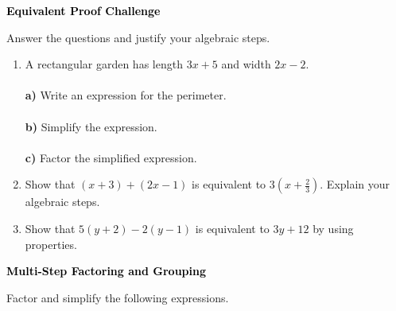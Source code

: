 \documentclass[12pt, letterpaper, fleqn]{article}
\newcommand{\blanklong}{\underline{\hspace{6.5cm}}}
\begin{document}
\newpage

\begin{tcolorbox}[colback=black!10]
\large\textcolor{black}{\textbf{Equivalent Proof Challenge}}
\end{tcolorbox}

\noindent
Answer the questions and justify your algebraic steps.

\vspace{3mm}

\begin{enumerate}[itemsep=2.2cm, leftmargin=0.6cm]

\item A rectangular garden has length $3x + 5$ and width $2x - 2$. \\ \\
\textbf{a)} Write an expression for the perimeter. \blanklong \\ \\
\textbf{b)} Simplify the expression. \blanklong \\ \\
\textbf{c)} Factor the simplified expression. \blanklong

\vspace{2cm}

\item Show that $(x+3) + (2x-1)$ is equivalent to $3(x + \frac{2}{3})$. Explain your algebraic steps.

\vspace{2cm}

\item Show that $5(y + 2) - 2(y - 1)$ is equivalent to $3y + 12$ by using properties.

\vspace{2cm}

\end{enumerate}

\newpage

\begin{tcolorbox}[colback=black!10]
\large\textcolor{black}{\textbf{Multi-Step Factoring and Grouping}}
\end{tcolorbox}

\noindent
Factor and simplify the following expressions.
\end{document}
